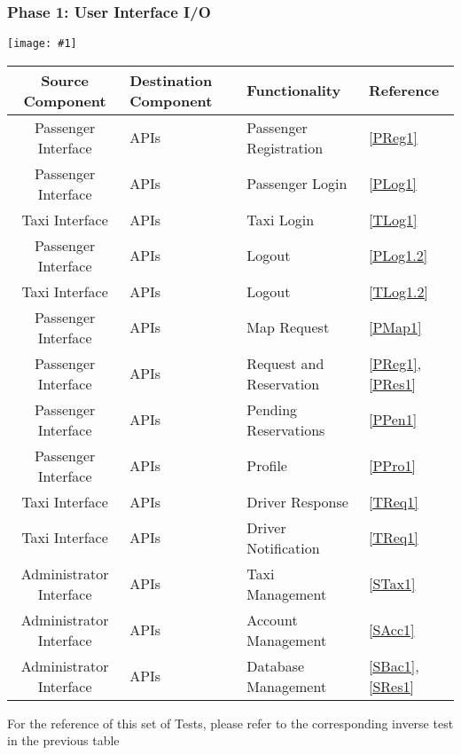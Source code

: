 \documentclass[11pt, a4paper,titlepage]{article}
\newcommand{\image}[1]{
	\begin{center}
		\noindent \texttt{[image: \#1]}
	\end{center}
}
\begin{document}
	\subsubsection{Phase 1: User Interface I/O}
	\image{test_phase1.png}
	\begin{tabularx}{\textwidth}{| c | X | X | X |}
		\hline \textbf{Source Component} &\textbf{Destination Component}&\textbf{Functionality} & \textbf{Reference} \\
		\hline Passenger Interface & APIs & Passenger Registration & \ref{PReg1} \\
		\hline Passenger Interface & APIs & Passenger Login & \ref{PLog1}\\
		\hline Taxi Interface & APIs & Taxi Login & \ref{TLog1}\\
		\hline Passenger Interface & APIs & Logout & \ref{PLog1.2}\\
		\hline Taxi Interface & APIs & Logout &\ref{TLog1.2}\\
		\hline Passenger Interface & APIs & Map Request & \ref{PMap1}\\
		\hline Passenger Interface & APIs &  Request and Reservation & \ref{PReg1}, \ref{PRes1}\\
		\hline Passenger Interface & APIs & Pending Reservations & \ref{PPen1}\\
		\hline Passenger Interface & APIs & Profile &\ref{PPro1}\\
		\hline Taxi Interface & APIs & Driver Response & \ref{TReq1}\\
		\hline Taxi Interface & APIs & Driver Notification &\ref{TReq1}\\
		\hline Administrator Interface & APIs & Taxi Management &\ref{STax1}\\
		\hline Administrator Interface & APIs & Account Management & \ref{SAcc1}\\
		\hline Administrator Interface & APIs & Database Management & \ref{SBac1}, \ref{SRes1}\\
		\hline
	\end{tabularx}
	\newpage
	For the reference of this set of Tests, please refer to the corresponding inverse test in the previous table \newline
	
\end{document}
